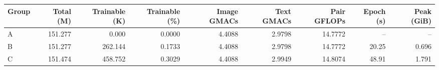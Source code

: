 \begin{tabular}{lrrrrrrrr}
\toprule
Group & Total (M) & Trainable (K) & Trainable (\%) & Image GMACs & Text GMACs & Pair GFLOPs & Epoch (s) & Peak (GiB)\\
\midrule
A & 151.277 & 0.000 & 0.0000 & 4.4088 & 2.9798 & 14.7772 & -- & -- \\
B & 151.277 & 262.144 & 0.1733 & 4.4088 & 2.9798 & 14.7772 & 20.25 & 0.696 \\
C & 151.474 & 458.752 & 0.3029 & 4.4088 & 2.9949 & 14.8074 & 48.91 & 1.791 \\
\bottomrule
\end{tabular}

